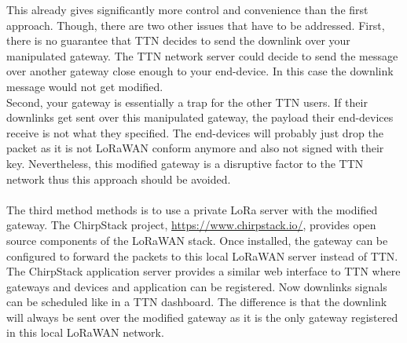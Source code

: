 This already gives significantly more control and convenience than the first approach. Though, there are two other issues that have to be addressed.
First, there is no guarantee that TTN decides to send the downlink over your manipulated gateway. The TTN network server could decide to send the message over another gateway close enough to
your end-device. In this case the downlink message would not get modified.
\\
Second, your gateway is essentially a trap for the other TTN users. If their downlinks get sent over this manipulated gateway, 
the payload their end-devices receive is not what they specified. The end-devices will probably just drop the packet as 
it is not LoRaWAN conform anymore and also not signed with their key. Nevertheless, this modified gateway is a disruptive factor 
to the TTN network thus this approach should be avoided.
\\
\\
The third method methods is to use a private LoRa server with the modified gateway. 
The ChirpStack project, \url{https://www.chirpstack.io/}, provides open source components of the LoRaWAN stack. 
Once installed, the gateway can be configured to forward the packets to this local LoRaWAN server instead of TTN. 
The ChirpStack application server provides a similar web interface to TTN where gateways and devices and application can be registered.
Now downlinks signals can be scheduled like in a TTN dashboard. The difference is that the downlink will always be sent over the modified gateway
as it is the only gateway registered in this local LoRaWAN network.

